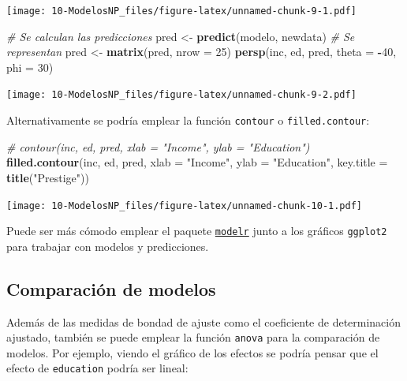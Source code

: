 \documentclass[]{book}
\newenvironment{Shaded}{\begin{snugshade}}{\end{snugshade}}
\newcommand{\KeywordTok}[1]{\textcolor[rgb]{0.13,0.29,0.53}{\textbf{#1}}}
\newcommand{\DataTypeTok}[1]{\textcolor[rgb]{0.13,0.29,0.53}{#1}}
\newcommand{\DecValTok}[1]{\textcolor[rgb]{0.00,0.00,0.81}{#1}}
\newcommand{\StringTok}[1]{\textcolor[rgb]{0.31,0.60,0.02}{#1}}
\newcommand{\CommentTok}[1]{\textcolor[rgb]{0.56,0.35,0.01}{\textit{#1}}}
\newcommand{\OperatorTok}[1]{\textcolor[rgb]{0.81,0.36,0.00}{\textbf{#1}}}
\newcommand{\NormalTok}[1]{#1}
\begin{document}
\texttt{[image: 10-ModelosNP\_files/figure-latex/unnamed-chunk-9-1.pdf]}

\begin{Shaded}
\begin{Highlighting}[]
\CommentTok{# Se calculan las predicciones}
\NormalTok{pred <-}\StringTok{ }\KeywordTok{predict}\NormalTok{(modelo, newdata)}
\CommentTok{# Se representan}
\NormalTok{pred <-}\StringTok{ }\KeywordTok{matrix}\NormalTok{(pred, }\DataTypeTok{nrow =} \DecValTok{25}\NormalTok{)}
\KeywordTok{persp}\NormalTok{(inc, ed, pred, }\DataTypeTok{theta =} \OperatorTok{-}\DecValTok{40}\NormalTok{, }\DataTypeTok{phi =} \DecValTok{30}\NormalTok{)}
\end{Highlighting}
\end{Shaded}

\texttt{[image: 10-ModelosNP\_files/figure-latex/unnamed-chunk-9-2.pdf]}

Alternativamente se podría emplear la función \texttt{contour} o
\texttt{filled.contour}:

\begin{Shaded}
\begin{Highlighting}[]
\CommentTok{# contour(inc, ed, pred, xlab = "Income", ylab = "Education")}
\KeywordTok{filled.contour}\NormalTok{(inc, ed, pred, }\DataTypeTok{xlab =} \StringTok{"Income"}\NormalTok{, }\DataTypeTok{ylab =} \StringTok{"Education"}\NormalTok{, }\DataTypeTok{key.title =} \KeywordTok{title}\NormalTok{(}\StringTok{"Prestige"}\NormalTok{))}
\end{Highlighting}
\end{Shaded}

\texttt{[image: 10-ModelosNP\_files/figure-latex/unnamed-chunk-10-1.pdf]}

Puede ser más cómodo emplear el paquete
\href{https://github.com/hadley/modelr}{\texttt{modelr}} junto a los
gráficos \texttt{ggplot2} para trabajar con modelos y predicciones.

\subsection{Comparación de modelos}\label{comparacion-de-modelos}

Además de las medidas de bondad de ajuste como el coeficiente de
determinación ajustado, también se puede emplear la función
\texttt{anova} para la comparación de modelos. Por ejemplo, viendo el
gráfico de los efectos se podría pensar que el efecto de
\texttt{education} podría ser lineal:
\end{document}
